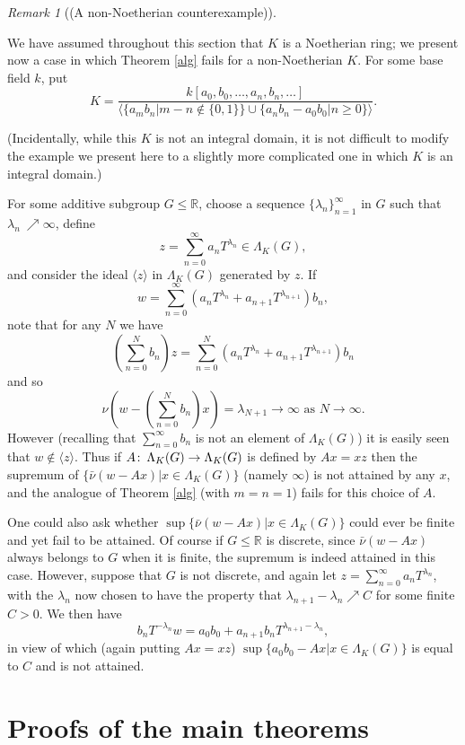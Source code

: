 \documentclass{amsart}
\theoremstyle{plain}
\theoremstyle{definition}
\theoremstyle{remark}
\newtheorem{remark}[theorem]{Remark}
\def\co{\colon\thinspace}
\def\barnu{\bar{\nu}}
\begin{document}
\begin{remark}[(A non-Noetherian counterexample)] \label{non-noeth}

We have assumed throughout this section that $K$ is a Noetherian ring; we present now a case in which Theorem \ref{alg} fails for a non-Noetherian $K$.  For some base field $k$, put 
\[ K=\frac{k[a_0,b_0,\ldots,a_n,b_n,\ldots]}{\langle \{a_m b_n|m-n\notin\{0,1\}\}\cup \{a_nb_n-a_0b_0|n\geq 0\}\rangle}.\]

(Incidentally, while this $K$ is not an integral domain, it is not difficult to modify the example we present here to a slightly more complicated one in which $K$ is an integral domain.)

For some additive subgroup $G\leq \mathbb{R}$, choose a sequence $\{\lambda_n\}_{n=1}^{\infty}$ in $G$ such that $\lambda_n\
\nearrow\infty$,  define \[ z=\sum_{n=0}^{\infty}a_nT^{\lambda_n}\in \Lambda_K(G),\] and consider the ideal $\langle z\rangle$ in $\Lambda_K(G)$ generated by $z$.   If \[ w=\sum_{n=0}^{\infty}(a_nT^{\lambda_n}+a_{n+1}T^{\lambda_{n+1}})b_n ,\] note that for any $N$ we have  \[ \left(\sum_{n=0}^{N}b_n\right)z=\sum_{n=0}^{N}(a_nT^{\lambda_n}+a_{n+1}T^{\lambda_{n+1}})b_n\] and so \[ \nu\left(w-\left(\sum_{n=0}^{N}b_n\right)x\right)=\lambda_{N+1}\to\infty \mbox{ as }N\to\infty.\]  However (recalling that $\sum_{n=0}^{\infty}b_n$ is not an element of $\Lambda_K(G)$) it is easily seen that $w\notin \langle z\rangle$.  Thus if $A\co\Lambda_K(G)\to\Lambda_K(G)$ is defined by $Ax=xz$ then the supremum of $\{\barnu(w-Ax)|x\in \Lambda_K(G)\}$ (namely $\infty$) is not attained by any $x$, and the analogue of Theorem \ref{alg} (with $m=n=1$) fails for this choice of $A$. 

One could also ask whether $\sup\{\barnu(w-Ax)|x\in \Lambda_K(G)\}$ could ever be finite and yet fail to be attained.  Of course if $G\leq \mathbb{R}$ is discrete, since $\barnu(w-Ax)$ always belongs to $G$ when it is finite, the supremum is indeed attained in this case.  However, suppose that $G$ is not discrete, and again let $z=\sum_{n=0}^{\infty}a_nT^{\lambda_n}$, with the $\lambda_n$ now chosen to have the property that $\lambda_{n+1}-\lambda_n\nearrow C$ for some finite $C>0$.  We then have \[ b_nT^{-\lambda_n}w=a_0b_0+a_{n+1}b_nT^{\lambda_{n+1}-\lambda_n},\] in view of which (again putting $Ax=xz$) $\sup\{a_0b_0-Ax|x\in\Lambda_K(G)\}$ is equal to $C$ and is not attained.
\end{remark}

\section{Proofs of the main theorems}
\end{document}
